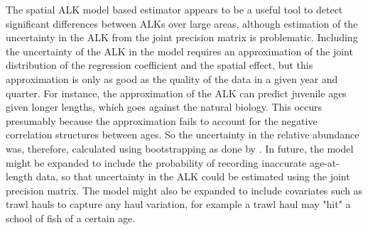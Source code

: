 \documentclass[a4paper 12pt]{article}
\numberwithin{equation}{section}
\begin{document}

The spatial ALK model based estimator appears to be a useful tool to detect significant differences between ALKs over large areas, although estimation of the uncertainty in the ALK from the joint precision matrix is problematic. Including the uncertainty of the ALK in the model requires an approximation of the joint distribution of the regression coefficient and the spatial effect, but this approximation is only as good as the quality of the data in a given year and quarter. For instance, the approximation of the ALK can predict juvenile ages given longer lengths, which goes against the natural biology. This occurs presumably because the approximation fails to account for the negative correlation structures between ages. So the uncertainty in the relative abundance was, therefore, calculated using bootstrapping as done by \citet{berg2012spatial,berg2014evaluation}. In future, the model might be expanded to include the probability of recording inaccurate age-at-length data, so that uncertainty in the ALK could be estimated using the joint precision matrix. The model might also be expanded to include covariates such as trawl hauls to capture any haul variation, for example a trawl haul may "hit" a school of fish  of a certain age.
\end{document}
